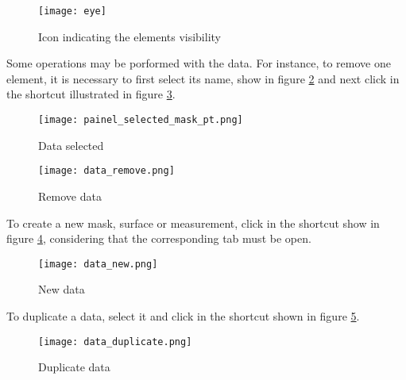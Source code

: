 \newpage

\begin{figure}[!htb]
\centering
\texttt{[image: eye]}
\caption{Icon indicating the elements visibility}
\label{fig:disable_mask}
\end{figure}


Some operations may be porformed with the data. For instance, to remove one element, it is necessary to first select
its name, show in figure \ref{fig:selected_mask} and next click in the shortcut illustrated in
figure \ref{fig:delete_data}.

\begin{figure}[!htb]
\centering
\texttt{[image: painel\_selected\_mask\_pt.png]}
\caption{Data selected}
\label{fig:selected_mask}
\end{figure}


\begin{figure}[!htb]
\centering
\texttt{[image: data\_remove.png]}
\caption{Remove data}
\label{fig:delete_data}
\end{figure}


To create a new mask, surface or measurement, click in the shortcut show in figure \ref{fig:new_data}, considering that
the corresponding tab must be open.

\begin{figure}[!htb]
\centering
\texttt{[image: data\_new.png]}
\caption{New data}
\label{fig:new_data}
\end{figure}


To duplicate a data, select it and click in the shortcut shown in figure \ref{fig:duplicate_data}.

\begin{figure}[!htb]
\centering
\texttt{[image: data\_duplicate.png]}
\caption{Duplicate data}
\label{fig:duplicate_data}
\end{figure}


